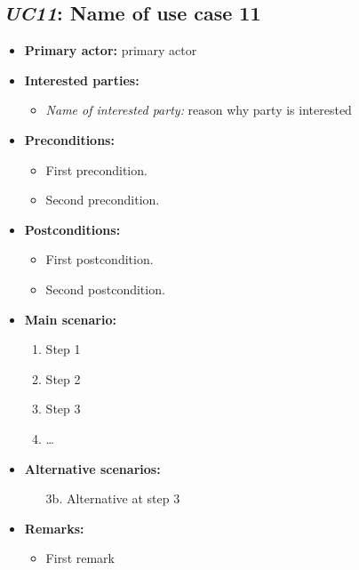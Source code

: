 \documentclass[a4paper,10pt]{article}
\begin{document}
\subsection{\emph{UC11}: Name of use case 11}
\begin{itemize}
    \item \textbf{Primary actor:} primary actor
    \item \textbf{Interested parties:} 
        \begin{itemize}
            \item \textit{Name of interested party:} reason why party is interested
        \end{itemize}

    \item \textbf{Preconditions:}
        \begin{itemize}
            \item First precondition.
            \item Second precondition.
        \end{itemize}

    \item \textbf{Postconditions:}
        \begin{itemize}
            \item First postcondition.
            \item Second postcondition.
        \end{itemize}
        
    \item \textbf{Main scenario:} 
    \begin{enumerate}
       \item Step 1
       \item Step 2
       \item Step 3
       \item \ldots
    \end{enumerate}

    \item \textbf{Alternative scenarios:} 
    \begin{enumerate}
        \item [3b.] Alternative at step 3
    \end{enumerate}
    
    \item \textbf{Remarks:}
        \begin{itemize}
            \item First remark
        \end{itemize}
\end{itemize}
\end{document}
